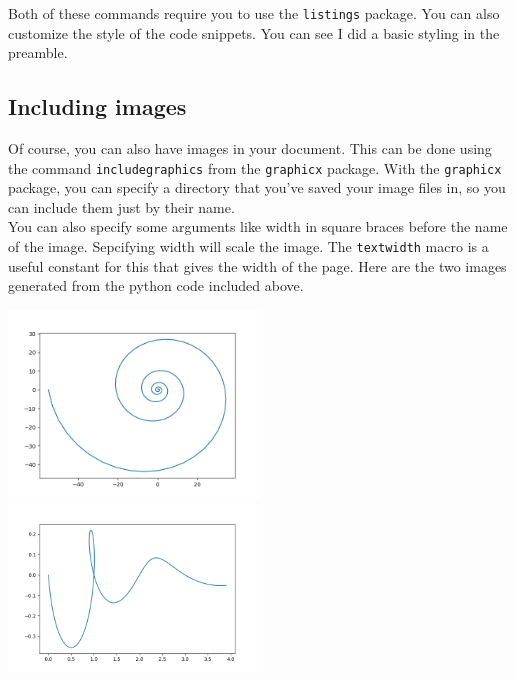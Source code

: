\documentclass{article}
\begin{document}


Both of these commands require you to use the \lstinline{listings} package.
You can also customize the style of the code snippets. You can see I did a
basic styling in the preamble.

\subsection*{Including images}
Of course, you can also have images in your document. This can be done using
the command \lstinline{includegraphics} from the \lstinline{graphicx} package.
With the \lstinline{graphicx} package, you can specify a directory that you've
saved your image files in, so you can include them just by their name.~\\

You can also specify some arguments like width in square braces before the name
of the image. Sepcifying width will scale the image. The \lstinline{textwidth}
macro is a useful constant for this that gives the width of the page.
Here are the two images generated from the python code included above.

\includegraphics[width=0.5\textwidth]{fibonacci-negative-n.png}
\includegraphics[width=0.5\textwidth]{fibonacci-positive-n.png}
\end{document}
